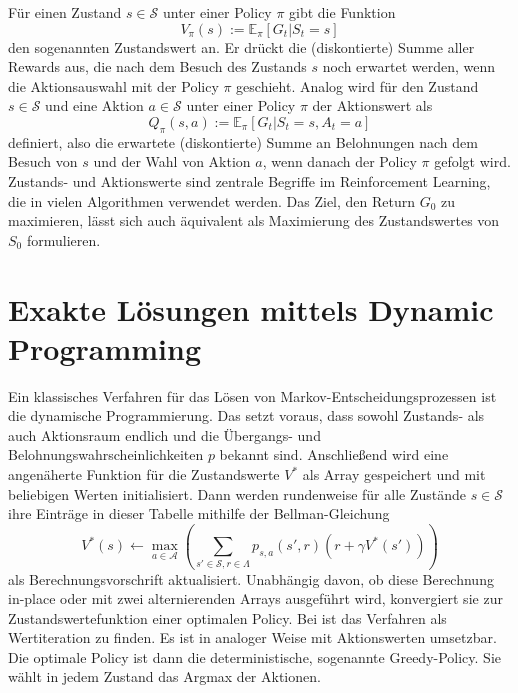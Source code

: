 Für einen Zustand $s \in \mathcal{S}$ unter einer Policy $\pi$ gibt die Funktion
\begin{equation}
	V_\pi(s) := \mathbb{E}_\pi\left[G_t | S_t = s\right]
\end{equation}
den sogenannten Zustandswert an.
Er drückt die (diskontierte) Summe aller Rewards aus, die nach dem Besuch des Zustands $s$ noch erwartet werden, wenn die Aktionsauswahl mit der Policy $\pi$ geschieht.
Analog wird für den Zustand $s \in \mathcal{S}$ und eine Aktion $a \in \mathcal{S}$ unter einer Policy $\pi$ der Aktionswert als
\begin{equation}
	Q_\pi(s, a) := \mathbb{E}_\pi\left[G_t | S_t = s, A_t = a\right]
\end{equation}
definiert, also die erwartete (diskontierte) Summe an Belohnungen nach dem Besuch von $s$ und der Wahl von Aktion $a$, wenn danach der Policy $\pi$ gefolgt wird.
Zustands- und Aktionswerte sind zentrale Begriffe im Reinforcement Learning, die in vielen Algorithmen verwendet werden.
Das Ziel, den Return $G_0$ zu maximieren, lässt sich auch äquivalent als Maximierung des Zustandswertes von $S_0$ formulieren.

\section{Exakte Lösungen mittels Dynamic Programming}
\label{section:dp}
Ein klassisches Verfahren für das Lösen von Markov-Entscheidungsprozessen ist die dynamische Programmierung.
Das setzt voraus, dass sowohl Zustands- als auch Aktionsraum endlich und die Übergangs- und Belohnungswahrscheinlichkeiten $p$ bekannt sind.
Anschließend wird eine angenäherte Funktion für die Zustandswerte $V^*$ als Array gespeichert und mit beliebigen Werten initialisiert.
Dann werden rundenweise für alle Zustände $s\in\mathcal{S}$ ihre Einträge in dieser Tabelle mithilfe der Bellman-Gleichung
\begin{equation}
	V^*(s) \leftarrow \max_{a\in\mathcal{A}}{\left(\sum_{s'\in\mathcal{S}, r \in \Lambda}{p_{s, a}\left(s', r\right) \left(r + \gamma V^*(s')\right)}\right)}
\end{equation}
als Berechnungsvorschrift aktualisiert.
Unabhängig davon, ob diese Berechnung in-place oder mit zwei alternierenden Arrays ausgeführt wird, konvergiert sie zur Zustandswertefunktion einer optimalen Policy.
Bei \cite{Sutton1998} ist das Verfahren als Wertiteration zu finden.
Es ist in analoger Weise mit Aktionswerten umsetzbar.
Die optimale Policy ist dann die deterministische, sogenannte Greedy-Policy.
Sie wählt in jedem Zustand das Argmax der Aktionen.

